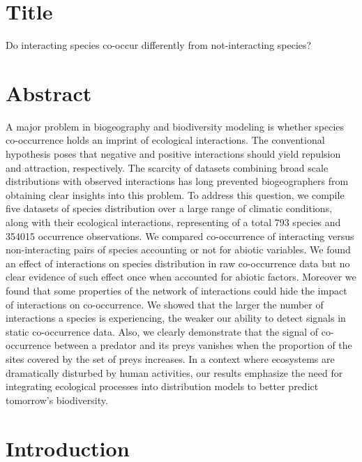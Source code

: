 \section{Title}\label{title}

Do interacting species co-occur differently from not-interacting
species?

\section{Abstract}\label{abstract}

A major problem in biogeography and biodiversity modeling is whether
species co-occurrence holds an imprint of ecological interactions. The
conventional hypothesis poses that negative and positive interactions
should yield repulsion and attraction, respectively. The scarcity of
datasets combining broad scale distributions with observed interactions
has long prevented biogeographers from obtaining clear insights into
this problem. To address this question, we compile five datasets of
species distribution over a large range of climatic conditions, along
with their ecological interactions, representing of a total 793 species
and 354015 occurrence observations. We compared co-occurrence of
interacting versus non-interacting pairs of species accounting or not
for abiotic variables. We found an effect of interactions on species
distribution in raw co-occurrence data but no clear evidence of such
effect once when accounted for abiotic factors. Moreover we found that
some properties of the network of interactions could hide the impact of
interactions on co-occurrence. We showed that the larger the number of
interactions a species is experiencing, the weaker our ability to detect
signals in static co-occurrence data. Also, we clearly demonstrate that
the signal of co-occurrence between a predator and its preys vanishes
when the proportion of the sites covered by the set of preys increases.
In a context where ecosystems are dramatically disturbed by human
activities, our results emphasize the need for integrating ecological
processes into distribution models to better predict tomorrow's
biodiversity.

\section{Introduction}\label{introduction}

